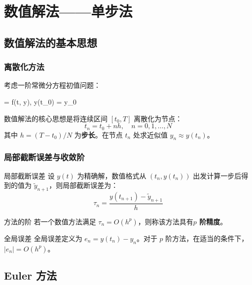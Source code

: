 \chapter{数值解法——单步法}


\section{数值解法的基本思想}

\subsection{离散化方法}

考虑一阶常微分方程初值问题：
\begin{myformula}
	 = f(t, y), \quad y(t_0) = y_0
\end{myformula}

数值解法的核心思想是将连续区间 $[t_0, T]$ 离散化为节点：
\[
t_n = t_0 + n h, \quad n = 0, 1, \ldots, N
\]
其中 $h = (T - t_0)/N$ 为\textbf{步长}。在节点 $t_n$ 处求近似值 $y_n \approx y(t_n)$。

\subsection{局部截断误差与收敛阶}

\begin{mydefinition}{局部截断误差}
	设 $y(t)$ 为精确解，数值格式从 $(t_n, y(t_n))$ 出发计算一步后得到的值为 $\tilde{y}_{n+1}$，则局部截断误差为：
	\[
	\tau_n = \frac{y(t_{n+1}) - \tilde{y}_{n+1}}{h}
	\]
\end{mydefinition}

\begin{mydefinition}{方法的阶}
	若一个数值方法满足 $\tau_n = O(h^p)$，则称该方法具有\textbf{$p$ 阶精度}。
\end{mydefinition}

\begin{mydefinition}{全局误差}
	全局误差定义为 $e_n = y(t_n) - y_n$。对于 $p$ 阶方法，在适当的条件下，$|e_n| = O(h^p)$。
\end{mydefinition}

\section{Euler 方法}


